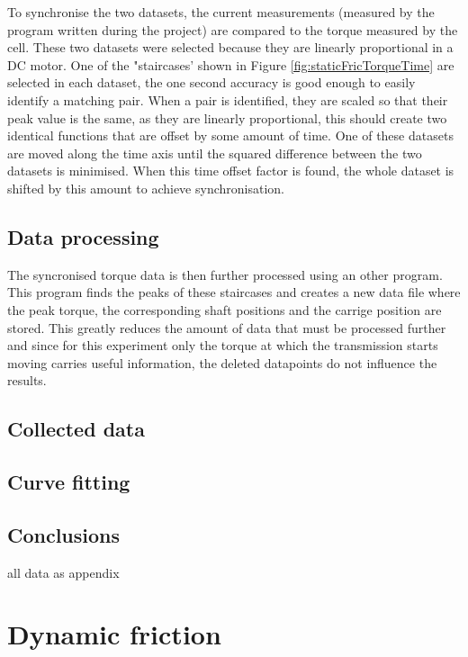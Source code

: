 \documentclass[12pt]{article}
\begin{document}
To synchronise the two datasets, the current measurements (measured by the program written during the project) are compared to the torque measured by the cell. These two datasets were selected because they are linearly proportional in a DC motor. One of the "staircases' shown in Figure \ref{fig:staticFricTorqueTime} are selected in each dataset, the one second accuracy is good enough to easily identify a matching pair. When a pair is identified, they are scaled so that their peak value is the same, as they are linearly proportional, this should create two identical functions that are offset by some amount of time. One of these datasets are moved along the time axis until the squared difference between the two datasets is minimised. When this time offset factor is found, the whole dataset is shifted by this amount to achieve synchronisation.


\subsection{Data processing}
The syncronised torque data is then further processed using an other program. This program finds the peaks of these staircases and creates a new data file where the peak torque, the corresponding shaft positions and the carrige position are stored. This greatly reduces the amount of data that must be processed further and since for this experiment only the torque at which the transmission starts moving carries useful information, the deleted datapoints do not influence the results. 




\subsection{Collected data}
\subsection{Curve fitting}
\subsection{Conclusions}





all data as appendix 


\pagebreak

\section{Dynamic friction}
\end{document}
